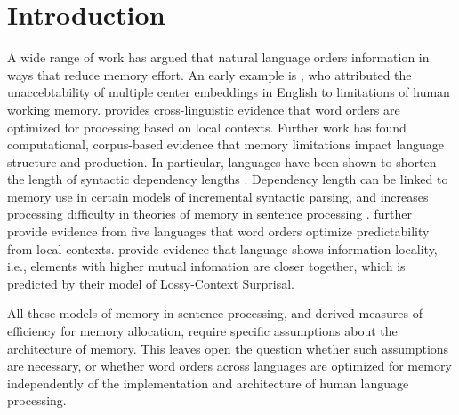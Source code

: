 \documentclass[11pt,letterpaper]{article}
\begin{document}
\section{Introduction}

A wide range of work has argued that natural language orders information in ways that reduce memory effort.
An early example is \cite{miller-finitary-1963}, who attributed the unaccebtability of multiple center embeddings in English to limitations of human working memory.
\cite{hawkins-efficiency-2003} provides cross-linguistic evidence that word orders are optimized for processing based on local contexts.
Further work has found computational, corpus-based evidence that memory limitations impact language structure and production.
In particular, languages have been shown to shorten the length of syntactic dependency lengths \citep{futrell-large-scale-2015}.
Dependency length can be linked to memory use in certain models of incremental syntactic parsing, and increases processing difficulty in theories of memory in sentence processing \citep{gibson-linguistic-1998}.
\cite{gildea-human-2015} further provide evidence from five languages that word orders optimize predictability from local contexts.
\cite{futrell-noisy-context-2017} provide evidence that language shows information locality, i.e., elements with higher mutual infomation are closer together, which is predicted by their model of Lossy-Context Surprisal.

%
%
%
%
%





All these models of memory in sentence processing, and derived measures of efficiency for memory allocation, require specific assumptions about the architecture of memory.
This leaves open the question whether such assumptions are necessary, or whether word orders across languages are optimized for memory independently of the implementation and architecture of human language processing.
\end{document}
